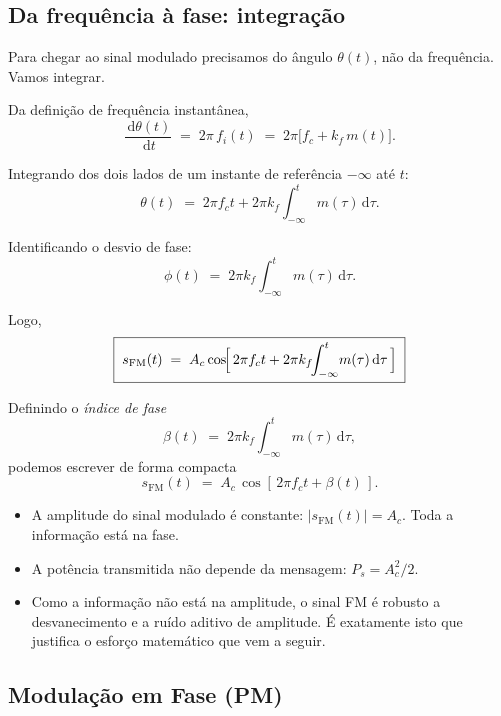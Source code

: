 \documentclass[11pt,a4paper]{article}
\newcommand{\FM}{\text{FM}}
\newcommand{\dd}{\,\mathrm{d}}
\begin{document}
\subsection{Da frequência à fase: integração}

Para chegar ao sinal modulado precisamos do ângulo $\theta(t)$, não da frequência. Vamos integrar.

\begin{quadro}
Da definição de frequência instantânea,
\[
  \frac{\dd \theta(t)}{\dd t} \;=\; 2\pi\,f_i(t) \;=\; 2\pi\bigl[f_c + k_f\,m(t)\bigr].
\]

Integrando dos dois lados de um instante de referência $-\infty$ até $t$:
\[
  \theta(t) \;=\; 2\pi f_c t + 2\pi k_f\!\!\int_{-\infty}^{t}\! m(\tau)\dd\tau.
\]

Identificando o desvio de fase:
\[
  \phi(t) \;=\; 2\pi k_f\!\!\int_{-\infty}^{t}\! m(\tau)\dd\tau.
\]

Logo,
\[
  \boxed{\;s_{\FM}(t) \;=\; A_c\cos\!\Bigl[\,2\pi f_c t + 2\pi k_f\!\!\int_{-\infty}^{t}\! m(\tau)\dd\tau\,\Bigr]\;}
\]
\end{quadro}

Definindo o \emph{índice de fase}
\[
  \beta(t) \;=\; 2\pi k_f \!\!\int_{-\infty}^{t}\! m(\tau)\dd\tau,
\]
podemos escrever de forma compacta
\[
  s_{\FM}(t) \;=\; A_c\,\cos[\,2\pi f_c t + \beta(t)\,].
\]

\begin{observacao}
\begin{itemize}
  \item A amplitude do sinal modulado é constante: $|s_{\FM}(t)|=A_c$. Toda a informação está na fase.
  \item A potência transmitida não depende da mensagem: $P_s = A_c^2/2$.
  \item Como a informação não está na amplitude, o sinal FM é robusto a desvanecimento e a ruído aditivo de amplitude. É exatamente isto que justifica o esforço matemático que vem a seguir.
\end{itemize}
\end{observacao}

\subsection{Modulação em Fase (PM)}
\end{document}
